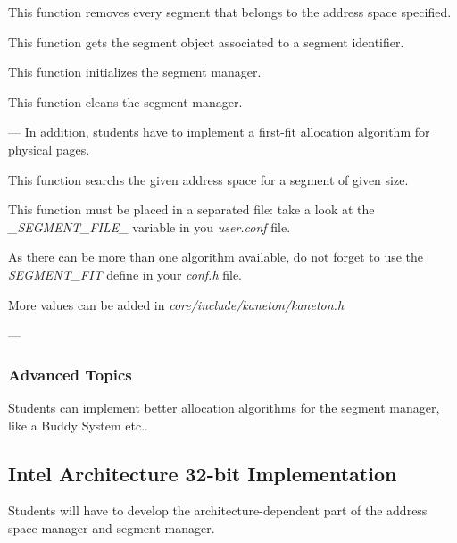 	  {This function removes every segment that belongs to the
	    address space specified.}

	  {This function gets the segment object associated to a segment
	    identifier.}

	  {This function initializes the segment manager.}

	  {This function cleans the segment manager.}

---
In addition, students have to implement a first-fit allocation
algorithm for physical pages.

	  {This function searchs the given address space for a segment
	    of given size.

	    This function must be placed in a separated file: take a look
	    at the \textit{\_SEGMENT\_FILE\_} variable in you
	    \textit{user.conf} file.

	    As there can be more than one algorithm available, do not forget
	    to use the \textit{SEGMENT\_FIT} define in your \textit{conf.h}
	    file.

	    More values can be added in
	    \textit{core/include/kaneton/kaneton.h}}

---

%
%

\subsubsection{Advanced Topics}

Students can implement better allocation algorithms for the segment manager,
like a Buddy System etc..

%
%

\subsection{Intel Architecture 32-bit Implementation}

Students will have to develop the architecture-dependent part of the
address space manager and segment manager.

